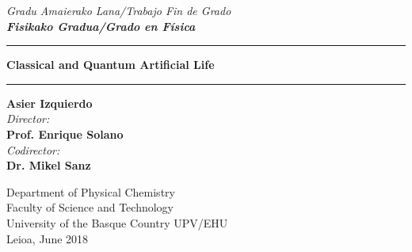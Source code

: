 \documentclass[11pt]{article}
\numberwithin{equation}{section} %
\numberwithin{figure}{section} %
\begin{document}
\begin{center}
\thispagestyle{empty}

\vspace*{-3.5cm}




\vspace{2cm}

{\centering \textit{\large{Gradu Amaierako Lana/Trabajo Fin de Grado}}} \\
\vspace{0.3cm}
{\centering \textit{{ \bf{Fisikako Gradua/Grado en F\'isica}}}}
\bigskip
{\centering \large
\par \vspace{2cm}

\hrule \vspace*{0.5cm}

{\LARGE \bf {Classical and Quantum Artificial Life}}

\vspace{0.5cm}\hrule \vspace{3 cm}
{\Large \bf{Asier Izquierdo}}\\
\vspace{1.25cm}
{\it{Director:}} \\
\vspace{0.1cm}
{\large \bf {Prof. Enrique Solano}}\\
\vspace{0.1cm}
{\it{Codirector:}} \\
\vspace{0.1cm}
{\large \bf {Dr. Mikel Sanz}}\\

\vspace{5 cm}

Department of Physical Chemistry \\
Faculty of Science and Technology \\
University of the Basque Country UPV/EHU \\
\vspace*{0.5cm}
Leioa, June 2018}
\end{center}
\end{document}

